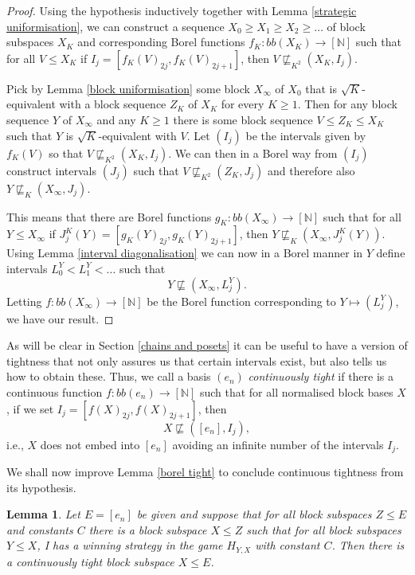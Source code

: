 \documentclass[10pt]{amsart}
\numberwithin{equation}{section}
\newtheorem{lemme}[thm]{Lemma}
\begin{document}
\begin{proof}
Using the hypothesis inductively together with Lemma \ref{strategic
uniformisation}, we can construct a sequence $X_0{\ensuremath{\geqslant}} X_1{\ensuremath{\geqslant}} X_2{\ensuremath{\geqslant}} \ldots$
of block subspaces $X_K$ and corresponding Borel functions $f_K\colon
bb(X_K){\rightarrow} [{\mathbb N}]$ such that for all $V{\ensuremath{\leqslant}} X_K$ if
$I_j=[f_K(V)_{2j},f_K(V)_{2j+1}]$, then $V\not\sqsubseteq_{K^2} (X_K,I_j)$.

Pick by Lemma \ref{block uniformisation} some block $X_\infty$ of $X_0$ that is
$\sqrt K$-equivalent with a block sequence $Z_K$ of $X_K$ for every $K{\ensuremath{\geqslant}} 1$.
Then for any block sequence $Y$ of $X_\infty$ and any $K{\ensuremath{\geqslant}} 1$ there is some
block sequence $V{\ensuremath{\leqslant}} Z_K{\ensuremath{\leqslant}} X_K$ such that $Y$ is $\sqrt K$-equivalent with
$V$. Let $(I_j)$ be the intervals given by $f_K(V)$ so that
$V\not\sqsubseteq_{K^2}(X_K,I_j)$. We can then in a Borel way from $(I_j)$
construct intervals $(J_j)$ such that $V\not\sqsubseteq_{K^2}(Z_K,J_j)$ and
therefore also $Y\not\sqsubseteq_{K}(X_\infty,J_j)$.

This means that there are Borel functions $g_K\colon bb(X_\infty){\rightarrow} [{\mathbb N}]$
such that for all $Y{\ensuremath{\leqslant}} X_\infty$ if $J^K_j(Y)=[g_K(Y)_{2j},g_K(Y)_{2j+1}]$,
then $Y\not\sqsubseteq_K (X_\infty, J^K_j(Y))$. Using Lemma \ref{interval
diagonalisation} we can now in a Borel manner in $Y$ define intervals
$L^Y_0<L^Y_1<\ldots$ such that
$$
Y\not\sqsubseteq (X_\infty,L^Y_j).
$$
Letting $f\colon bb(X_\infty){\rightarrow} [{\mathbb N}]$ be the Borel function corresponding to $Y\mapsto (L^Y_j)$, we have our result.
\end{proof}

As will be clear in Section \ref{chains and posets} it can be useful to have a
version of tightness that not only assures us that certain intervals exist, but
also tells us how to obtain these. Thus, we  call a basis $(e_n)$ {\em
continuously tight} if there is a continuous function $f\colon bb(e_n){\rightarrow}
[{\mathbb N}]$ such that for all normalised block bases $X$, if we set
$I_j=[f(X)_{2j},f(X)_{2j+1}]$, then
$$
X\not\sqsubseteq ([e_n],I_j),
$$
i.e., $X$ does not embed into $[e_n]$ avoiding an infinite number of the intervals $I_j$.

We shall now improve Lemma \ref{borel tight} to conclude continuous tightness from its hypothesis.
\begin{lemme}\label{cont tight}
Let $E=[e_n]$ be  given and suppose that for all block subspaces $Z{\ensuremath{\leqslant}} E$ and
constants $C$ there is a block subspace $X{\ensuremath{\leqslant}} Z$ such that for all block
subspaces $Y{\ensuremath{\leqslant}} X$, I has a winning strategy in the game $H_{Y,X}$ with
constant $C$. Then there is a continuously tight block subspace $X{\ensuremath{\leqslant}} E$.
\end{lemme}
\end{document}
